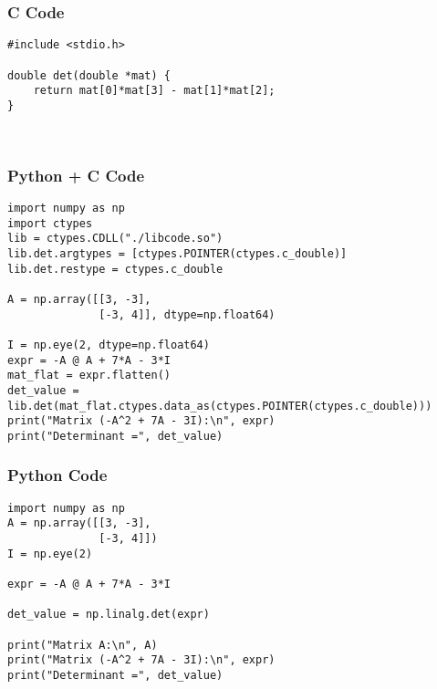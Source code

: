 \documentclass{beamer}
\begin{document}
\begin{frame}[fragile]
    \frametitle{C Code}
    \begin{lstlisting}
#include <stdio.h>

double det(double *mat) {
    return mat[0]*mat[3] - mat[1]*mat[2];
}



    \end{lstlisting}
\end{frame}
\begin{frame}[fragile]
    \frametitle{Python + C Code}
    \begin{lstlisting}
import numpy as np
import ctypes
lib = ctypes.CDLL("./libcode.so")   
lib.det.argtypes = [ctypes.POINTER(ctypes.c_double)]
lib.det.restype = ctypes.c_double

A = np.array([[3, -3],
              [-3, 4]], dtype=np.float64)

I = np.eye(2, dtype=np.float64)
expr = -A @ A + 7*A - 3*I
mat_flat = expr.flatten()
det_value = lib.det(mat_flat.ctypes.data_as(ctypes.POINTER(ctypes.c_double)))
print("Matrix (-A^2 + 7A - 3I):\n", expr)
print("Determinant =", det_value)
    \end{lstlisting}
\end{frame}

\begin{frame}[fragile]
    \frametitle{Python Code}
    \begin{lstlisting}
import numpy as np
A = np.array([[3, -3],
              [-3, 4]])
I = np.eye(2)

expr = -A @ A + 7*A - 3*I

det_value = np.linalg.det(expr)

print("Matrix A:\n", A)
print("Matrix (-A^2 + 7A - 3I):\n", expr)
print("Determinant =", det_value)


    \end{lstlisting}
\end{frame}
\end{document}
